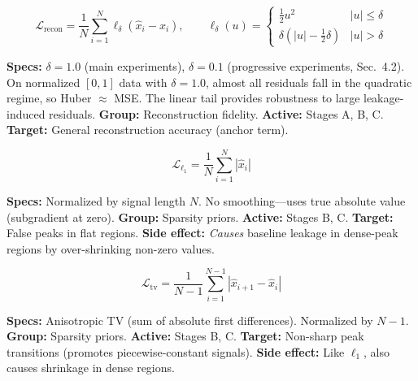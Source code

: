 \documentclass[11pt, letterpaper]{article}
\begin{document}
\begin{questionbox}
\normalfont
$$
\mathcal{L}_{\text{recon}} = \frac{1}{N} \sum_{i=1}^{N} \ell_\delta(\hat{x}_i - x_i), \qquad
\ell_\delta(u) = \begin{cases}
    \frac{1}{2}u^2 & |u| \leq \delta \\
    \delta(|u| - \frac{1}{2}\delta) & |u| > \delta
\end{cases}
$$
\end{questionbox}
\begin{answerbox}
\textbf{Specs:} $\delta = 1.0$ (main experiments), $\delta = 0.1$ (progressive experiments, Sec.~4.2).
On normalized $[0,1]$ data with $\delta = 1.0$, almost all residuals fall in the quadratic regime, so
Huber $\approx$ MSE.  The linear tail provides robustness to large leakage-induced residuals.
\textbf{Group:} Reconstruction fidelity.  \textbf{Active:} Stages A, B, C.
\textbf{Target:} General reconstruction accuracy (anchor term).
\end{answerbox}

\vspace{0.3em}

\begin{questionbox}
\normalfont
$$
\mathcal{L}_{\ell_1} = \frac{1}{N} \sum_{i=1}^{N} |\hat{x}_i|
$$
\end{questionbox}
\begin{answerbox}
\textbf{Specs:} Normalized by signal length $N$.  No smoothing---uses true absolute value (subgradient at zero).
\textbf{Group:} Sparsity priors.  \textbf{Active:} Stages B, C.
\textbf{Target:} False peaks in flat regions.
\textbf{Side effect:} \emph{Causes} baseline leakage in dense-peak regions by over-shrinking non-zero values.
\end{answerbox}

\vspace{0.3em}

\begin{questionbox}
\normalfont
$$
\mathcal{L}_{\text{tv}} = \frac{1}{N-1} \sum_{i=1}^{N-1} |\hat{x}_{i+1} - \hat{x}_i|
$$
\end{questionbox}
\begin{answerbox}
\textbf{Specs:} Anisotropic TV (sum of absolute first differences).  Normalized by $N-1$.
\textbf{Group:} Sparsity priors.  \textbf{Active:} Stages B, C.
\textbf{Target:} Non-sharp peak transitions (promotes piecewise-constant signals).
\textbf{Side effect:} Like $\ell_1$, also causes shrinkage in dense regions.
\end{answerbox}
\end{document}
